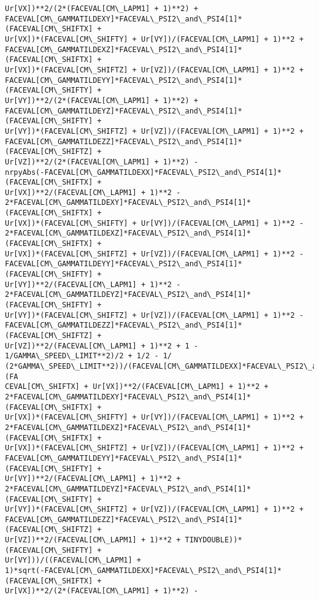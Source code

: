 \documentclass[landscape,letterpaper,10pt,english]{article}
\begin{document}
\begin{Verbatim}[commandchars=\\\{\}]
Ur[VX])**2/(2*(FACEVAL[CM\_LAPM1] + 1)**2) +
FACEVAL[CM\_GAMMATILDEXY]*FACEVAL\_PSI2\_and\_PSI4[1]*(FACEVAL[CM\_SHIFTX] +
Ur[VX])*(FACEVAL[CM\_SHIFTY] + Ur[VY])/(FACEVAL[CM\_LAPM1] + 1)**2 +
FACEVAL[CM\_GAMMATILDEXZ]*FACEVAL\_PSI2\_and\_PSI4[1]*(FACEVAL[CM\_SHIFTX] +
Ur[VX])*(FACEVAL[CM\_SHIFTZ] + Ur[VZ])/(FACEVAL[CM\_LAPM1] + 1)**2 +
FACEVAL[CM\_GAMMATILDEYY]*FACEVAL\_PSI2\_and\_PSI4[1]*(FACEVAL[CM\_SHIFTY] +
Ur[VY])**2/(2*(FACEVAL[CM\_LAPM1] + 1)**2) +
FACEVAL[CM\_GAMMATILDEYZ]*FACEVAL\_PSI2\_and\_PSI4[1]*(FACEVAL[CM\_SHIFTY] +
Ur[VY])*(FACEVAL[CM\_SHIFTZ] + Ur[VZ])/(FACEVAL[CM\_LAPM1] + 1)**2 +
FACEVAL[CM\_GAMMATILDEZZ]*FACEVAL\_PSI2\_and\_PSI4[1]*(FACEVAL[CM\_SHIFTZ] +
Ur[VZ])**2/(2*(FACEVAL[CM\_LAPM1] + 1)**2) -
nrpyAbs(-FACEVAL[CM\_GAMMATILDEXX]*FACEVAL\_PSI2\_and\_PSI4[1]*(FACEVAL[CM\_SHIFTX] +
Ur[VX])**2/(FACEVAL[CM\_LAPM1] + 1)**2 -
2*FACEVAL[CM\_GAMMATILDEXY]*FACEVAL\_PSI2\_and\_PSI4[1]*(FACEVAL[CM\_SHIFTX] +
Ur[VX])*(FACEVAL[CM\_SHIFTY] + Ur[VY])/(FACEVAL[CM\_LAPM1] + 1)**2 -
2*FACEVAL[CM\_GAMMATILDEXZ]*FACEVAL\_PSI2\_and\_PSI4[1]*(FACEVAL[CM\_SHIFTX] +
Ur[VX])*(FACEVAL[CM\_SHIFTZ] + Ur[VZ])/(FACEVAL[CM\_LAPM1] + 1)**2 -
FACEVAL[CM\_GAMMATILDEYY]*FACEVAL\_PSI2\_and\_PSI4[1]*(FACEVAL[CM\_SHIFTY] +
Ur[VY])**2/(FACEVAL[CM\_LAPM1] + 1)**2 -
2*FACEVAL[CM\_GAMMATILDEYZ]*FACEVAL\_PSI2\_and\_PSI4[1]*(FACEVAL[CM\_SHIFTY] +
Ur[VY])*(FACEVAL[CM\_SHIFTZ] + Ur[VZ])/(FACEVAL[CM\_LAPM1] + 1)**2 -
FACEVAL[CM\_GAMMATILDEZZ]*FACEVAL\_PSI2\_and\_PSI4[1]*(FACEVAL[CM\_SHIFTZ] +
Ur[VZ])**2/(FACEVAL[CM\_LAPM1] + 1)**2 + 1 - 1/GAMMA\_SPEED\_LIMIT**2)/2 + 1/2 - 1/
(2*GAMMA\_SPEED\_LIMIT**2))/(FACEVAL[CM\_GAMMATILDEXX]*FACEVAL\_PSI2\_and\_PSI4[1]*(FA
CEVAL[CM\_SHIFTX] + Ur[VX])**2/(FACEVAL[CM\_LAPM1] + 1)**2 +
2*FACEVAL[CM\_GAMMATILDEXY]*FACEVAL\_PSI2\_and\_PSI4[1]*(FACEVAL[CM\_SHIFTX] +
Ur[VX])*(FACEVAL[CM\_SHIFTY] + Ur[VY])/(FACEVAL[CM\_LAPM1] + 1)**2 +
2*FACEVAL[CM\_GAMMATILDEXZ]*FACEVAL\_PSI2\_and\_PSI4[1]*(FACEVAL[CM\_SHIFTX] +
Ur[VX])*(FACEVAL[CM\_SHIFTZ] + Ur[VZ])/(FACEVAL[CM\_LAPM1] + 1)**2 +
FACEVAL[CM\_GAMMATILDEYY]*FACEVAL\_PSI2\_and\_PSI4[1]*(FACEVAL[CM\_SHIFTY] +
Ur[VY])**2/(FACEVAL[CM\_LAPM1] + 1)**2 +
2*FACEVAL[CM\_GAMMATILDEYZ]*FACEVAL\_PSI2\_and\_PSI4[1]*(FACEVAL[CM\_SHIFTY] +
Ur[VY])*(FACEVAL[CM\_SHIFTZ] + Ur[VZ])/(FACEVAL[CM\_LAPM1] + 1)**2 +
FACEVAL[CM\_GAMMATILDEZZ]*FACEVAL\_PSI2\_and\_PSI4[1]*(FACEVAL[CM\_SHIFTZ] +
Ur[VZ])**2/(FACEVAL[CM\_LAPM1] + 1)**2 + TINYDOUBLE))*(FACEVAL[CM\_SHIFTY] +
Ur[VY]))/((FACEVAL[CM\_LAPM1] +
1)*sqrt(-FACEVAL[CM\_GAMMATILDEXX]*FACEVAL\_PSI2\_and\_PSI4[1]*(FACEVAL[CM\_SHIFTX] +
Ur[VX])**2/(2*(FACEVAL[CM\_LAPM1] + 1)**2) -

\end{Verbatim}
\end{document}
